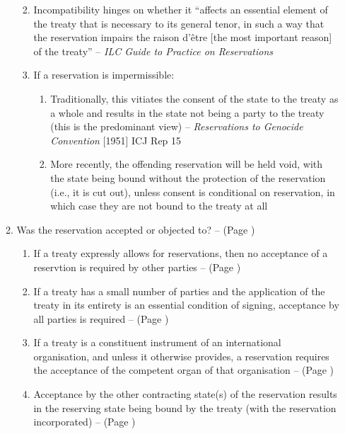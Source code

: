 \begin{enumerate}
\begin{enumerate}
\begin{enumerate}
\begin{enumerate}
            \end{enumerate}
            \item Incompatibility hinges on whether it “affects an essential element of the treaty that is necessary to its general tenor, in such a way that the reservation impairs the raison d'être [the most important reason] of the treaty” -- \textit{ILC Guide to Practice on Reservations}
            \item If a reservation is impermissible:
            \begin{enumerate}
                \item Traditionally, this vitiates the consent of the state to the treaty as a whole and results in the state not being a party to the treaty (this is the predominant view) -- \textit{Reservations to Genocide Convention} [1951] ICJ Rep 15
                \item More recently, the offending reservation will be held void, with the state being bound without the protection of the reservation (i.e., it is cut out), unless consent is conditional on reservation, in which case they are not bound to the treaty at all
            \end{enumerate}
        \end{enumerate}
        \item Was the reservation accepted or objected to? --  (Page \pageref{VCLT Art 20})
        \begin{enumerate}
            \item If a treaty expressly allows for reservations, then no acceptance of a reservtion is required by other parties --  (Page \pageref{VCLT Art 20})
            \item If a treaty has a small number of parties and the application of the treaty in its entirety is an essential condition of signing, acceptance by all parties is required --  (Page \pageref{VCLT Art 20})
            \item If a treaty is a constituent instrument of an international organisation, and unless it otherwise provides, a reservation requires the acceptance of the competent organ of that organisation --  (Page \pageref{VCLT Art 20})
            \item Acceptance by the other contracting state(s) of the reservation results in the reserving state being bound by the treaty (with the reservation incorporated) --  (Page \pageref{VCLT Art 20})

\end{enumerate}
\end{enumerate}
\end{enumerate}
